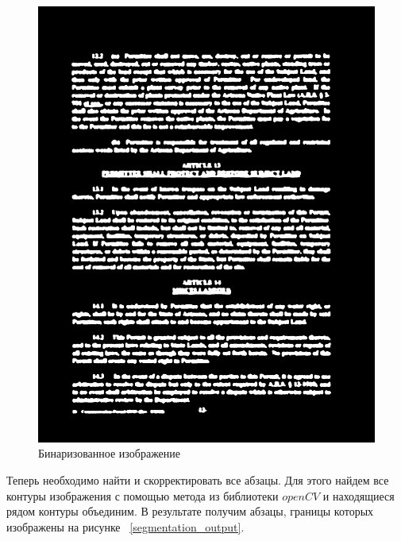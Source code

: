\begin{figure}
    \includegraphics[scale=0.2]{img/paragraph/thresh.png}
    \caption{Бинаризованное изображение}
    \label{segmentation_threshold}
\end{figure}

Теперь необходимо найти и скорректировать все абзацы. Для этого найдем все контуры изображения с помощью метода из библиотеки $openCV$ \cite{opencv_contours} и находящиеся рядом контуры объединим.
В результате получим абзацы, границы которых изображены на рисунке ~\ref{segmentation_output}.


